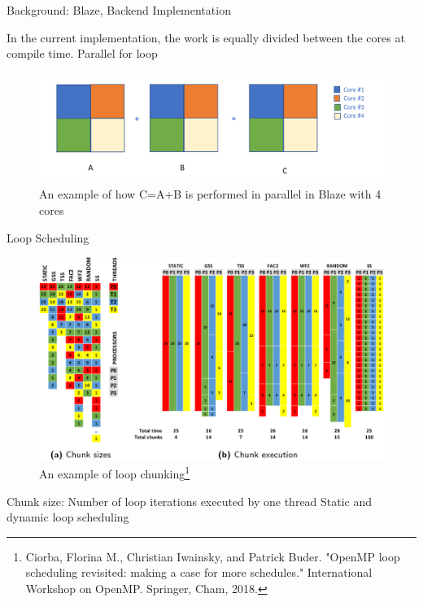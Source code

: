\documentclass[10pt]{beamer}
\begin{document}
\begin{frame}{Background: Blaze, Backend Implementation}
	\begin{outline}
		In the current implementation, the work is equally divided between the cores at compile time. 
		\1Parallel for loop
		\begin{figure}
			\centering
			\includegraphics[width=0.72\linewidth]{images/old_backend.png}
			\caption{An example of how C=A+B is performed in parallel in Blaze with 4 cores}	
		\end{figure}	

	\end{outline}
\end{frame}

\begin{frame}{Loop Scheduling}
	\begin{outline}
			\begin{figure}[]
			\centering
			\includegraphics[scale=0.2]{images/loop.png}
			\caption{An example of loop chunking\footnote{Ciorba, Florina M., Christian Iwainsky, and Patrick Buder. "OpenMP loop scheduling revisited: making a case for more schedules." International Workshop on OpenMP. Springer, Cham, 2018.}}	
			\label{fig_loop}
		\end{figure}
		Chunk size: Number of loop iterations executed by one thread 
		\1Static and dynamic loop scheduling

	\end{outline}
\end{frame}
\end{document}

